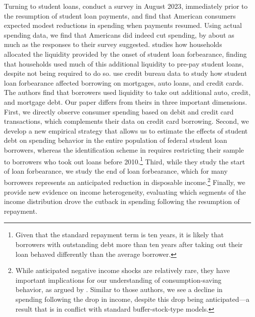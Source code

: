 \documentclass[12pt]{article}
\begin{document}
Turning to student loans, \cite{chakrabarti2023borrower} conduct a survey in August 2023, immediately prior to the resumption of student loan payments, and find that American consumers expected modest reductions in spending when payments resumed. Using actual spending data, we find that Americans did indeed cut spending, by about as much as the responses to their survey suggested. \cite{katz_saving_2023} studies how households allocated the liquidity provided by the onset of student loan forbearance, finding that households used much of this additional liquidity to pre-pay student loans, despite not being required to do so. \cite{dinerstein2024debt} use credit bureau data to study how student loan forbearance affected borrowing on mortgages, auto loans, and credit cards. The authors find that borrowers used liquidity to take out additional auto, credit, and mortgage debt.  Our paper differs from theirs in three important dimensions.  First, we directly observe consumer spending based on debit and credit card transactions, which complements their data on credit card borrowing. Second, we develop a new empirical strategy that allows us to estimate the effects of student debt on spending behavior in the entire population of federal student loan borrowers, whereas the identification scheme in \cite{dinerstein2024debt} requires restricting their sample to borrowers who took out loans before 2010.\footnote{Given that the standard repayment term is ten years, it is likely that borrowers with outstanding debt more than ten years after taking out their loan behaved differently than the average borrower.}   Third, while they study the start of loan forbearance, we study the end of loan forbearance, which for many borrowers represents an anticipated reduction in disposable income.\footnote{While anticipated negative income shocks are relatively rare, they have important implications for our understanding of consumption-saving behavior, as argued by \cite{ganong2019consumer}. Similar to those authors, we see a decline in spending following the drop in income, despite this drop being anticipated---a result that is in conflict with standard buffer-stock-type models.}
Finally, we provide new evidence on income heterogeneity, evaluating which segments of the income distribution drove the cutback in spending following the resumption of repayment. 


   
\end{document}
